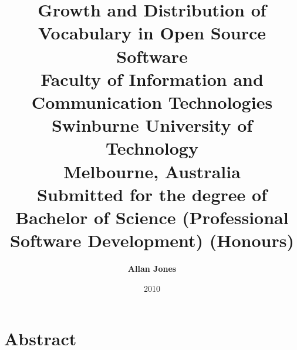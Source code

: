 \title{ \huge{\textbf{Growth and Distribution of Vocabulary in Open Source Software}} \\[1.2cm]
\large{Faculty of Information and Communication Technologies\\
Swinburne University of Technology\\
Melbourne, Australia\\}
\vspace{1.2cm} 
\large{Submitted for the degree of Bachelor of Science (Professional Software Development) (Honours)} \\
\vspace{1cm} 
} 
\author{ \Large{\textbf{Allan Jones}} } 
\date{2010} 
\maketitle

\newpage 
{}
\chapter*{Abstract}
\vspace{-0.75cm}


% 

